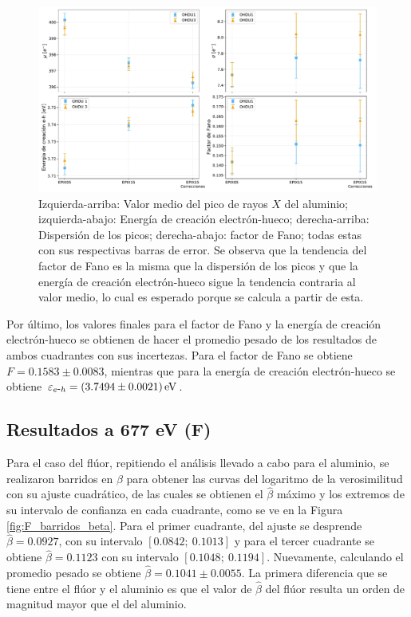 \begin{figure}[h]
    \centering
        \includegraphics[scale=0.45]{Figs/Al_mu_sigma_fano_Eeh.pdf}
    \caption{Izquierda-arriba: Valor medio del pico de rayos $X$ del aluminio; izquierda-abajo: Energía de creación electrón-hueco; derecha-arriba: Dispersión de los picos; derecha-abajo: factor de Fano; todas estas con sus respectivas barras de error. Se observa que la tendencia del factor de Fano es la misma que la dispersión de los picos y que la energía de creación electrón-hueco sigue la tendencia contraria al valor medio, lo cual es esperado porque se calcula a partir de esta.}
    \label{fig:Al_mu_sigma_fano_eh}
\end{figure}

Por último, los valores finales para el factor de Fano y la energía de creación electrón-hueco se obtienen de hacer el promedio pesado de los resultados de ambos cuadrantes con sus incertezas. Para el factor de Fano se obtiene $ F = 0.1583 \pm 0.0083 $, mientras que para la energía de creación electrón-hueco se obtiene $\varepsilon_{\eh} =(3.7494\pm0.0021)\,\si{eV}$.
\subsection{Resultados a 677 eV (F)}
\noindent Para el caso del flúor, repitiendo el análisis llevado a cabo para el aluminio, se realizaron barridos en $\beta$ para obtener las curvas del logaritmo de la verosimilitud con su ajuste cuadrático, de las cuales se obtienen el $\hat{\beta}$ máximo y los extremos de su intervalo de confianza en cada cuadrante, como se ve en la Figura \ref{fig:F_barridos_beta}. Para el primer cuadrante, del ajuste se desprende $\hat{\beta} = 0.0927 $, con su intervalo $[0.0842;\ 0.1013]$ y para el tercer cuadrante se obtiene $\hat{\beta} = 0.1123 $ con su intervalo $[0.1048;\ 0.1194]$. Nuevamente, calculando el promedio pesado se obtiene $\hat{\beta} = 0.1041 \pm 0.0055 $. La primera diferencia que se tiene entre el flúor y el aluminio es que el valor de $\hat{\beta}$ del flúor resulta un orden de magnitud mayor que el del aluminio.

